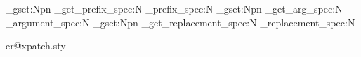 
\usepackage{etoolbox}
\usepackage{letltxmacro}

\usepackage{expl3}
\usepackage{xparse}

\usepackage{iftex}


\usepackage{regexpatch}

\makeatletter
\ExplSyntaxOn

  {} %
  {
      {
        \cs_gset:Npn \token_get_prefix_spec:N { \cs_prefix_spec:N }
        \cs_gset:Npn \token_get_arg_spec:N { \cs_argument_spec:N }
        \cs_gset:Npn \token_get_replacement_spec:N { \cs_replacement_spec:N }
      }
      {} %
  }
\ExplSyntaxOff
\makeatother

\expandafter\xdef\csname ver@xpatch.sty

